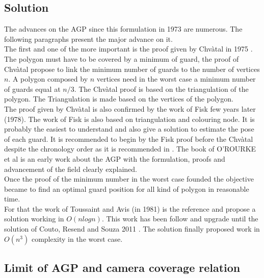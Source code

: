 	\subsection{Solution }
	
	The advances on the AGP since this formulation in 1973 are numerous. The following paragraphs present the major advance on it.\\
	 The first and one of the more important is the proof given by Chvàtal in 1975 \cite{44*chvatal1975}.  The polygon must have to be covered by a minimum of guard, the proof of Chvàtal propose to link the minimum number of guards to the number of vertices $n$. 
A polygon composed by $n$ vertices need in the worst case a minimum number of guards equal at $n/3$. The Chvàtal proof is based on the triangulation of the polygon. The Triangulation is made based on the vertices of the polygon.\\
	     The proof given by Chvàtal is also confirmed by the work of Fisk  few years later (1978). The work of Fisk is also based on triangulation and colouring node. It is probably the easiest to understand and also give a solution to estimate the pose of each guard. It is recommended to begin by the Fisk proof before the Chvàtal despite the chronology order as it is recommended in \cite{219*orourke1987}. The book of O'ROURKE et al \cite{219*orourke1987} is an early work about the AGP with the formulation, proofs and advancement of the field clearly explained. \\
Once the proof of the minimum number in the worst case founded the objective became to find an optimal guard position for all kind of polygon in reasonable time. \\
For that the work of Toussaint and Avis (in 1981) is the reference and propose a solution working in $O(n log n)$. This work has been follow and upgrade until the solution of Couto, Resend and Souza  2011 \cite{224*couto2011}. The solution  finally proposed work in $O(n^3)$ complexity in the worst case. 


	
	\subsection{Limit of AGP and camera coverage relation}

